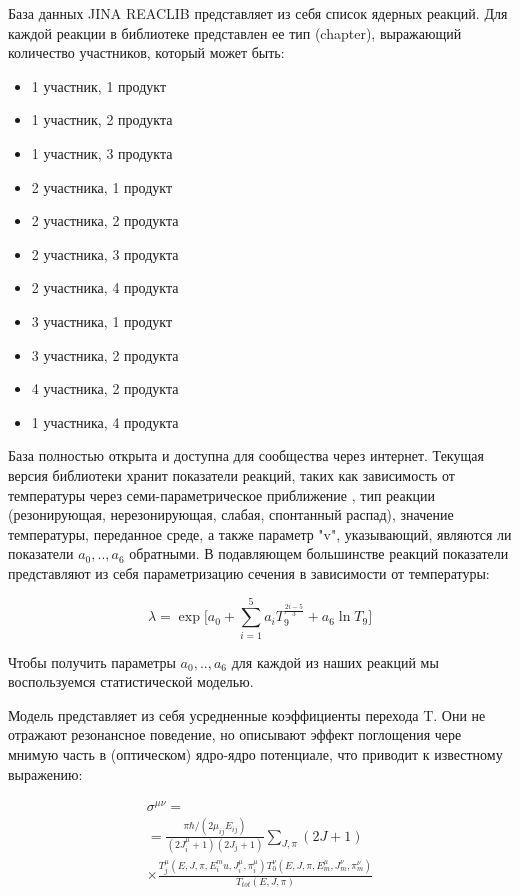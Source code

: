 \documentclass[%
master,    %
natbib,      %
subf,        %
href,        %
colorlinks,  %
]{disser}
\begin{document}
База данных JINA REACLIB представляет из себя список ядерных реакций. Для каждой реакции в библиотеке представлен ее тип (chapter), выражающий количество участников, который может быть:
\begin{itemize}
	\item 1 участник, 1 продукт
	\item 1 участник, 2 продукта
	\item 1 участник, 3 продукта
	\item 2 участника, 1 продукт
	\item 2 участника, 2 продукта
	\item 2 участника, 3 продукта
	\item 2 участника, 4 продукта
	\item 3 участника, 1 продукт
	\item 3 участника, 2 продукта
	\item 4 участника, 2 продукта
	\item 1 участника, 4 продукта
\end{itemize}
 База полностью открыта и доступна для сообщества через интернет. Текущая версия библиотеки хранит показатели реакций, таких как зависимость от температуры через семи-параметрическое приближение \cite{jina}, тип реакции (резонирующая, нерезонирующая, слабая, спонтанный распад), значение температуры, переданное среде, а также параметр "v", указывающий, являются ли показатели $a_0, .., a_6$ обратными. В подавляющем большинстве реакций показатели представляют из себя параметризацию сечения в зависимости от температуры:

$$\lambda = \exp \bigg[a_0 + \sum_{i=1}^{5}a_iT_9^{\frac{2i-5}{3}}+a_6 \ln T_9\bigg]$$

Чтобы получить параметры $a_0, .., a_6$ для каждой из наших реакций мы воспользуемся статистической моделью.

Модель представляет из себя усредненные коэффициенты перехода T. Они не отражают резонансное поведение, но описывают эффект поглощения чере мнимую часть в (оптическом) ядро-ядро потенциале, что приводит к известному выражению:


\begin{multline}
\sigma^{\mu\nu} = \\
= \frac{\pi\hbar/(2\mu_{ij}E_{ij})}{(2J_i^\mu+1)(2J_j+1)}\sum_{J,\pi}(2J + 1) \\
\times \frac{T_j^\mu(E,J,\pi,E_i^mu, J_i^\mu,\pi_i^\mu)T_0^\nu(E,J,\pi,E_m^\mu,J_m^\nu,\pi_m^\nu)}{T_{tot}(E,J,\pi)}
\end{multline}
\end{document}
